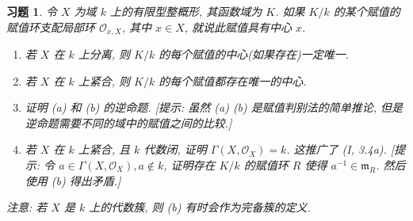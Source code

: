 \documentclass{article}
\theoremstyle{exercise}
\newtheorem{exercise}{习题}[section]
\theoremstyle{plain}
\theoremstyle{remark}
\def\gm{\mathfrak{m}}
\def\sO{\mathscr{O}}
\begin{document}
\begin{exercise}
  令 $X$ 为域 $k$ 上的有限型整概形, 其函数域为 $K$.
  如果 $K / k$ 的某个赋值的赋值环支配局部环 $\sO_{x, X}$, 其中 $x \in X$,
  就说此赋值具有\emph{中心} $x$.
  \begin{enumerate}[label=(\alph*)]
    \item 若 $X$ 在 $k$ 上分离, 则 $K / k$ 的每个赋值的中心(如果存在)一定唯一.
    \item 若 $X$ 在 $k$ 上紧合, 则 $K / k$ 的每个赋值都存在唯一的中心.
    \item 证明 (a) 和 (b) 的逆命题.
          [\emph{提示: 虽然 (a) (b) 是赋值判别法的简单推论,
          但是逆命题需要不同的域中的赋值之间的比较.}]
    \item 若 $X$ 在 $k$ 上紧合, 且 $k$ 代数闭,
          证明 $\Gamma(X, \sO_X) = k$.
          这推广了 (I, 3.4a).
          [\emph{提示: 令 $a \in \Gamma(X, \sO_X), a \notin k$,
          证明存在 $K / k$ 的赋值环 $R$ 使得 $a^{-1} \in \gm_R$.
          然后使用 (b) 得出矛盾.}]
  \end{enumerate}
  \textit{注意:} 若 $X$ 是 $k$ 上的代数簇, 则 (b) 有时会作为完备簇的定义.
\end{exercise}
\end{document}
